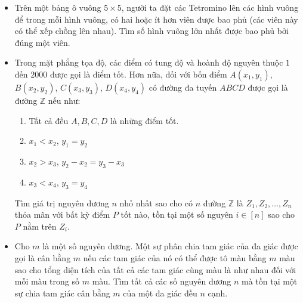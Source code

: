 \documentclass[11pt]{scrartcl}
\begin{document}
\begin{itemize}[label=, leftmargin=0em, itemsep=-0em]

    \item \begin{btvn}
        Trên một bảng ô vuông $5 \times 5$, người ta đặt các Tetromino
        lên các hình vuông để trong mỗi hình vuông, có hai hoặc ít hơn viên được bao phủ (các viên này có thể xếp chồng lên nhau). Tìm số hình vuông lớn nhất được bao phủ bởi đúng một viên.
    \end{btvn}


    \item \begin{btvn}
    Trong mặt phẳng tọa độ, các điểm có tung độ và hoành độ nguyên thuộc $1$ đến $2000$ được gọi là điểm tốt. Hơn nữa, đối với bốn điểm $A(x_1, y_1)$, $B(x_2, y_2)$, $C(x_3, y_3)$, $D(x_4, y_4)$ có đường đa tuyến $ABCD$ được gọi là đường $\mathbb{Z}$ nếu như:
    \begin{enumerate}
        \item Tất cả đều $A, B, C, D$ là những điểm tốt.
        \item  $x_1<x_2$, $y_1=y_2$
        \item $x_2>x_3$, $y_2-x_2=y_3-x_3$
        \item $x_3<x_4$, $y_3=y_4$
    \end{enumerate}
    
    Tìm giá trị nguyên dương $n$ nhỏ nhất sao cho có $n$ đường $\mathbb{Z}$ là $Z_1, Z_2,\dots, Z_n$ thỏa mãn với bất kỳ điểm $P$ tốt nào, tồn tại một số nguyên $i \in [n]$ sao cho $P$ nằm trên $Z_i$.
        
    \end{btvn}
    \item\begin{btvn}
        Cho $m$ là một số nguyên dương. Một sự phân chia tam giác của đa giác được gọi là cân bằng $m$ nếu các tam giác của nó có thể được tô màu bằng $m$ màu sao cho tổng diện tích của tất cả các tam giác cùng màu là như nhau đối với mỗi màu trong số $m$ màu. Tìm tất cả các số nguyên dương $n$ mà tồn tại một sự chia tam giác cân bằng $m$ của một đa giác đều $n$ cạnh.


\end{btvn}
\end{itemize}
\end{document}
